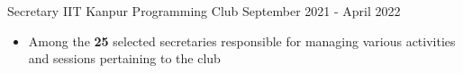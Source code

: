 \cventry
{Secretary} %
{IIT Kanpur} %
{Programming Club} %
{September 2021 - April 2022} %
{

  \begin{itemize} %
    \item Among the \textbf{25} selected secretaries responsible for managing various activities and sessions pertaining to the club
  \end{itemize}
}

\vspace{5mm}
